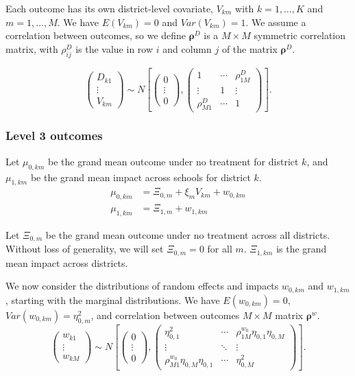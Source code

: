 \documentclass[12pt]{article}
\newcommand\mb[1]{\boldsymbol{#1}}
\begin{document}
Each outcome has its own district-level covariate, $V_{km}$ with $k = 1, \ldots, K$ and $m = 1, \ldots, M$.
We have $E(V_{km}) = 0$ and $Var(V_{km}) = 1$.
We assume a correlation between outcomes, so we define $\mb{\rho}^D$ is a $M \times M$ symmetric correlation matrix, with $\rho^D_{ij}$ is the value in row $i$ and column $j$ of the matrix $\mb{\rho}^D$.

\[ \left(
\begin{array}{c}
D_{k1}	\\
\vdots 	\\
V_{km}
\end{array}\right)
\sim
N\left[\left(
\begin{array}{c}
0		\\
\vdots 	\\
0
\end{array}\right),\left(
\begin{array}{ccc}
1 				& \cdots	& \rho^D_{1M}	\\
\vdots 			& 1			& \vdots 	\\
\rho^D_{M1}  	& \cdots	& 1
\end{array}
\right)\right].\]

\subsubsection{Level 3 outcomes}
\label{sec:level3_outcomes}

Let $\mu_{0,km}$ be the grand mean outcome under no treatment for district $k$, and
$\mu_{1,km}$ be the grand mean impact across schools for district $k$.
\begin{align}
\mu_{0,km} 	&= \Xi_{0,m} + \xi_{m} V_{km} + w_{0,km}  \\
\mu_{1,km} 	&= \Xi_{1,m} + w_{1,km}
\end{align}

Let $\Xi_{0,m}$ be the grand mean outcome under no treatment across all districts.
Without loss of generality, we will set $\Xi_{0,m} = 0$ for all $m$.
$\Xi_{1,km}$ is the grand mean impact across districts.

We now consider the distributions of random effects and impacts $w_{0,km}$ and $w_{1,km}$, starting with the marginal distributions.
We have $E(w_{0,km}) = 0$, $Var(w_{0,km}) = \eta_{0,m}^2$, and correlation between outcomes $M \times M$ matrix $\mb{\rho}^w$.
\[ \left(
\begin{array}{c}
w_{k1}	\\
\vdots 	\\
w_{kM}
\end{array}\right)
\sim
N\left[\left(
\begin{array}{c}
0		\\
\vdots 	\\
0
\end{array}\right),\left(
\begin{array}{ccc}
\eta_{0,1}^2						& \cdots		& \rho^{w_0}_{1M} \eta_{0,1} \eta_{0,M}	\\
\vdots 								& \ddots		& \vdots 	\\
\rho^{w_0}_{M1} \eta_{0,M} \eta_{0,1}  	& \cdots		& \eta_{0,M}^2
\end{array}
\right)\right].\]
\end{document}

